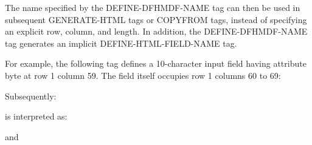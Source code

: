 \documentclass[letterpaper,10pt,english]{sphinxmanual}
\begin{document}
The name specified by the DEFINE-DFHMDF-NAME tag can then be used in subsequent GENERATE-HTML tags or COPYFROM tags, instead of specifying an explicit row, column, and length. In addition, the DEFINE-DFHMDF-NAME tag generates an implicit DEFINE-HTML-FIELD-NAME tag.

For example, the following tag defines a 10-character input field having attribute byte at row 1 column 59. The field  itself occupies row 1 columns 60 to 69:

\begin{sphinxVerbatim}[commandchars=\\\{\}]
    
\end{sphinxVerbatim}

Subsequently:

\begin{sphinxVerbatim}[commandchars=\\\{\}]
   
\end{sphinxVerbatim}

is interpreted as:

\begin{sphinxVerbatim}[commandchars=\\\{\}]
   
\end{sphinxVerbatim}

and

\begin{sphinxVerbatim}[commandchars=\\\{\}]
   
\end{sphinxVerbatim}
\end{document}

